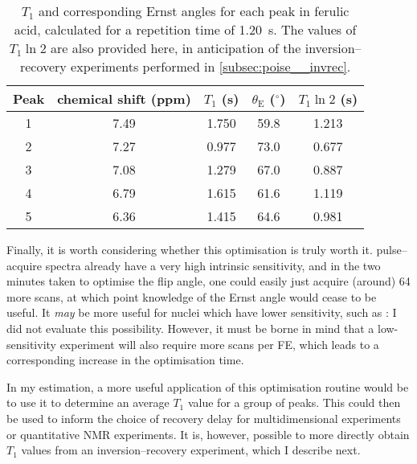 \begin{table}[htb]
    \centering
    \begin{tabular}{ccccc}
        \toprule
        Peak & \proton{} chemical shift (ppm) & $T_1$ (\si{\s}) & $\theta_\text{E}$ ($^\circ$) & $T_1\ln 2$ (\si{\s})\\
        \midrule
        1 & 7.49 & 1.750 & 59.8 & 1.213 \\
        2 & 7.27 & 0.977 & 73.0 & 0.677 \\
        3 & 7.08 & 1.279 & 67.0 & 0.887 \\
        4 & 6.79 & 1.615 & 61.6 & 1.119 \\
        5 & 6.36 & 1.415 & 64.6 & 0.981 \\
        \bottomrule
    \end{tabular}
    \caption[$T_1$ values for ferulic acid]{
        $T_1$ and corresponding Ernst angles for each peak in ferulic acid, calculated for a repetition time of \SI{1.20}{\s}.
        The values of $T_1 \ln 2$ are also provided here, in anticipation of the inversion--recovery experiments performed in \cref{subsec:poise__invrec}.
    }
    \label{tbl:ernst_invrec}
\end{table}

Finally, it is worth considering whether this optimisation is truly worth it.
\proton{} pulse--acquire spectra already have a very high intrinsic sensitivity, and in the two minutes taken to optimise the flip angle, one could easily just acquire (around) 64 more scans, at which point knowledge of the Ernst angle would cease to be useful.
It \textit{may} be more useful for nuclei which have lower sensitivity, such as \carbon{}: I did not evaluate this possibility.
However, it must be borne in mind that a low-sensitivity experiment will also require more scans per FE, which leads to a corresponding increase in the optimisation time.

In my estimation, a more useful application of this optimisation routine would be to use it to determine an average $T_1$ value for a group of peaks.
This could then be used to inform the choice of recovery delay for multidimensional experiments\autocite{Reynolds2002JNP,Burns2021MRC} or quantitative NMR experiments\autocite{Pauli2005JNP,Giraudeau2014MRC}.
It is, however, possible to more directly obtain $T_1$ values from an inversion--recovery experiment, which I describe next.
